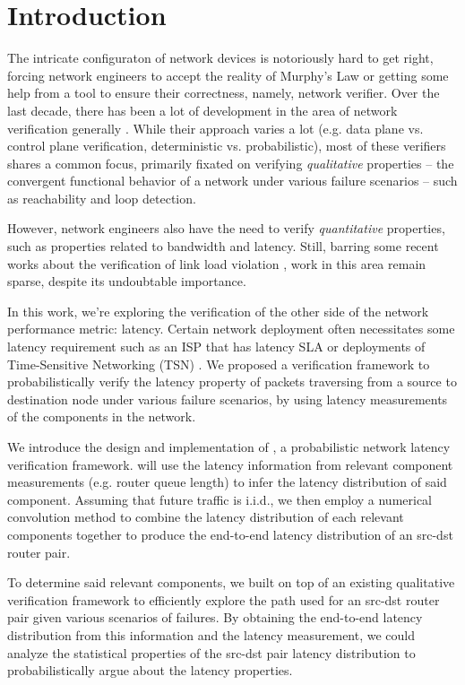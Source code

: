 \section{Introduction}
The intricate configuraton of network devices is notoriously hard to get right, forcing network 
engineers to accept the reality of Murphy's Law or getting some help from a tool to ensure their 
correctness, namely, network verifier.
Over the last decade, there has been a lot of development in the area of network verification 
generally \cite{hsa}\cite{veriflow}.
While their approach varies a lot (e.g. data plane vs. control plane verification, deterministic vs. 
probabilistic), most of these verifiers shares a common focus, primarily fixated on verifying 
\textit{qualitative} properties -- the convergent functional behavior of a network under various failure 
scenarios -- such as reachability and loop detection.

However, network engineers also have the need to verify \textit{quantitative} properties, such as properties 
related to bandwidth and latency.
Still, barring some recent works about the verification of link load violation \cite{qarc}, work in this area 
remain sparse, despite its undoubtable importance.

In this work, we're exploring the verification of the other side of the network performance metric: latency. 
Certain network deployment often necessitates some latency requirement such as an ISP that has 
latency SLA \cite{Verizon} or deployments of Time-Sensitive Networking (TSN) \cite{TSN}.
We proposed a verification framework to probabilistically verify the latency property of packets 
traversing from a source to destination node under various failure scenarios, by using latency 
measurements of the components in the network.

We introduce the design and implementation of \tool, a probabilistic network latency verification 
framework.
\tool will use the latency information from relevant component measurements (e.g. router queue length) 
to infer the latency distribution of said component.
Assuming that future traffic is i.i.d., we then employ a numerical convolution method to combine the
latency distribution of each relevant components together to produce the end-to-end latency distribution 
of an src-dst router pair. 

To determine said relevant components, we built \tool on top of an existing qualitative verification 
framework to efficiently explore the path used for an src-dst router pair given various scenarios of 
failures.
By obtaining the end-to-end latency distribution from this information and the latency measurement, 
we could analyze the statistical properties of the src-dst pair latency distribution to probabilistically 
argue about the latency properties.

